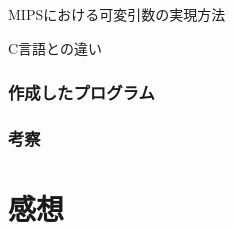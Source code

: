 \documentclass[a4j,11pt]{jarticle}
\begin{document}
MIPSにおける可変引数の実現方法

C言語との違い
  \subsubsection{作成したプログラム}

  \subsubsection{考察}

\section{感想}
\end{document}
